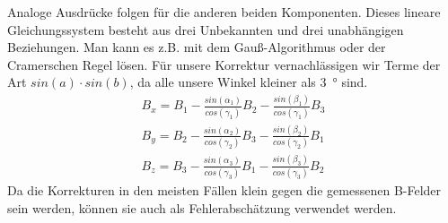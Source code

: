 \documentclass[12pt,a4paper]{article}
\begin{document}
Analoge Ausdrücke folgen für die anderen beiden Komponenten. Dieses lineare Gleichungssystem besteht aus drei Unbekannten und drei unabhängigen Beziehungen. Man kann es z.B. mit dem Gauß-Algorithmus oder der Cramerschen Regel lösen. Für unsere Korrektur vernachlässigen wir Terme der Art $sin(a)\cdot sin(b)$, da alle unsere Winkel kleiner als \SI{3}{\degree} sind. 
\begin{align*}
B_x = B_1 -\frac{sin(\alpha_1)}{cos(\gamma_1)}B_2 - \frac{sin(\beta_1)}{cos(\gamma_1)}B_3\\
B_y = B_2 -\frac{sin(\alpha_2)}{cos(\gamma_2)}B_3 - \frac{sin(\beta_2)}{cos(\gamma_2)}B_1\\
B_z = B_3 -\frac{sin(\alpha_3)}{cos(\gamma_3)}B_1 - \frac{sin(\beta_3)}{cos(\gamma_3)}B_2
\end{align*}
Da die Korrekturen in den meisten Fällen klein gegen die gemessenen B-Felder sein werden, können sie auch als Fehlerabschätzung verwendet werden.
\end{document}
